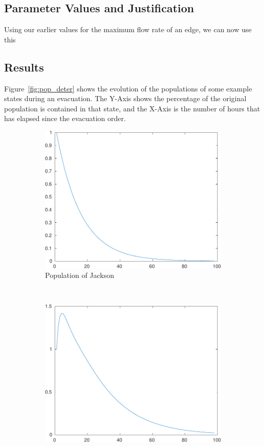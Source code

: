 \documentclass[titlepage]{article}
\begin{document}
  \subsection{Parameter Values and Justification}
    Using our earlier values for the maximum flow rate of an edge, we can now use this
  \subsection{Results}
      Figure~\ref{fig:pop_deter} shows the evolution of the populations of some example states during an evacuation. The Y-Axis shows the percentage of the original population is contained in that state, and the X-Axis is the number of hours that has elapsed since the evacuation order.
    \begin{figure}
      \center
      \begin{subfigure}[b]{0.3\textwidth}
        \center
        \includegraphics[width=\textwidth]{figures/pop_county_29-crop.pdf}
        \caption{Population of Jackson}
        \label{fig:pop_county60}
      \end{subfigure}~
      \begin{subfigure}[b]{0.3\textwidth}
        \center
        \includegraphics[width=\textwidth]{figures/pop_county_39-crop.pdf}

\end{subfigure}
\end{figure}
\end{document}
